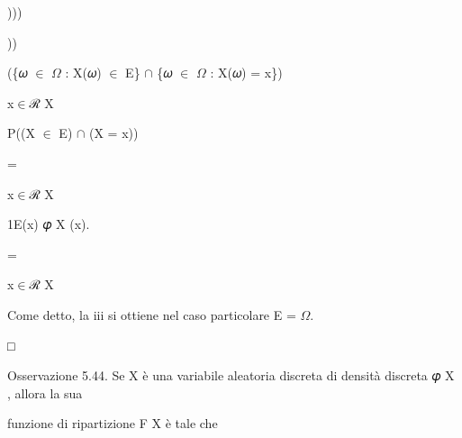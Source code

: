 \documentclass[a4paper,portrait,12pt]{article}
\begin{document}
)))


))





\begin{flushleft}
(\{𝜔 $\in$ $\Omega$ : X(𝜔) $\in$ E\} $\cap$ \{𝜔 $\in$ $\Omega$ : X(𝜔) = x\})
\end{flushleft}


\begin{flushleft}
x$\in$ℛ X
\end{flushleft}





\begin{flushleft}
P((X $\in$ E) $\cap$ (X = x))
\end{flushleft}





=


\begin{flushleft}
x$\in$ℛ X
\end{flushleft}





\begin{flushleft}
1E(x) 𝜑 X (x).
\end{flushleft}





=


\begin{flushleft}
x$\in$ℛ X
\end{flushleft}





\begin{flushleft}
Come detto, la iii si ottiene nel caso particolare E = $\Omega$.
\end{flushleft}





□





\begin{flushleft}
Osservazione 5.44. Se X \`{e} una variabile aleatoria discreta di densit\`{a} discreta 𝜑 X , allora la sua
\end{flushleft}


\begin{flushleft}
funzione di ripartizione F X \`{e} tale che
\end{flushleft}
\end{document}
